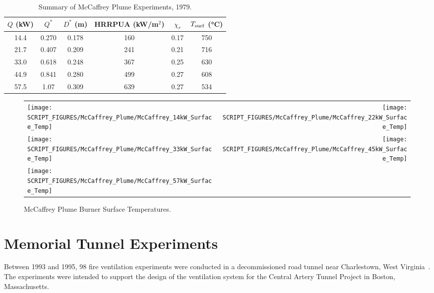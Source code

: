 \begin{table}[!ht]
\caption[Summary of McCaffrey Plume Experiments]{Summary of McCaffrey Plume Experiments, 1979.}
\begin{center}
\begin{tabular}{|c|c|c|c|c|c|}
\hline
$Q$ (kW) & $Q^*$    & $D^*$ (m)   & HRRPUA (kW/m$^2$)  & $\chi_r$ & $T_{\rm surf}$ (\si{\degreeCelsius}) \\ \hline\hline
14.4     & 0.270    & 0.178       & 160                & 0.17     & 750 \\ \hline
21.7     & 0.407    & 0.209       & 241                & 0.21     & 716 \\ \hline
33.0     & 0.618    & 0.248       & 367                & 0.25     & 630 \\ \hline
44.9     & 0.841    & 0.280       & 499                & 0.27     & 608 \\ \hline
57.5     & 1.07     & 0.309       & 639                & 0.27     & 534 \\ \hline
\end{tabular}
\end{center}
\label{tab:McCaffrey_Plume_Exp}
\end{table}

\begin{figure}[p]
\begin{tabular*}{\textwidth}{l@{\extracolsep{\fill}}r}
\texttt{[image: SCRIPT\_FIGURES/McCaffrey\_Plume/McCaffrey\_14kW\_Surface\_Temp]} &
\texttt{[image: SCRIPT\_FIGURES/McCaffrey\_Plume/McCaffrey\_22kW\_Surface\_Temp]} \\
\texttt{[image: SCRIPT\_FIGURES/McCaffrey\_Plume/McCaffrey\_33kW\_Surface\_Temp]} &
\texttt{[image: SCRIPT\_FIGURES/McCaffrey\_Plume/McCaffrey\_45kW\_Surface\_Temp]} \\
\texttt{[image: SCRIPT\_FIGURES/McCaffrey\_Plume/McCaffrey\_57kW\_Surface\_Temp]} &
\end{tabular*}
\caption[McCaffrey Plume Burner Surface Temperatures]
{McCaffrey Plume Burner Surface Temperatures.}
\label{fig:McCaffrey_Surf_Temp}
\end{figure}


\section{Memorial Tunnel Experiments}
\label{Memorial_Tunnel_Description}

Between 1993 and 1995, 98 fire ventilation experiments were conducted in a decommissioned road tunnel near Charlestown, West Virginia~\cite{Memorial}. The experiments were intended to support the design of the ventilation system for the Central Artery Tunnel Project in Boston, Massachusetts.

